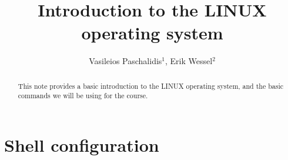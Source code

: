 \documentclass[aps,showpacs,prd,notitlepage,preprintnumbers,amsmath,amssymb,letterpaper]{revtex4}
\begin{document}
\title{Introduction to the LINUX operating system}
\author{Vasileios Paschalidis${}^1$, Erik Wessel${}^2$}                           
%
%
\begin{abstract}
  This note provides a basic introduction to the LINUX operating system, and the basic commands we will be using for the course. 
\end{abstract}



\maketitle
%

\section{Shell configuration}




\end{document}
